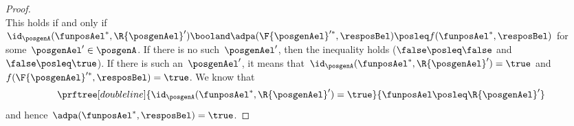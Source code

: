 \begin{proof}
\begin{equation*}
    \end{equation*}
    This holds if and only if~$\id_\posgenA(\funposAel^*,\R{\posgenAel}')\booland \adpa(\F{\posgenAel}'^*,\resposBel) \posleq f(\funposAel^*,\resposBel)$ for some~$\posgenAel'\in \posgenA$.
    If there is no such~$\posgenAel'$, then the inequality holds ($\false \posleq \false$ and $\false \posleq \true$).
    If there is such an~$\posgenAel'$, it means that~$\id_\posgenA(\funposAel^*,\R{\posgenAel}')=\true$ and~$f(\F{\posgenAel}'^*,\resposBel)=\true$.
    We know that
    \begin{equation*}
        \prftree[double line]{\id_\posgenA(\funposAel^*,\R{\posgenAel}')=\true}{\funposAel \posleq \R{\posgenAel}'}
    \end{equation*}
    and hence~$\adpa(\funposAel^*,\resposBel)=\true$.
\end{proof}